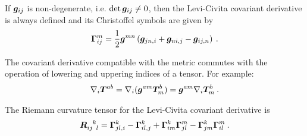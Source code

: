 If $\boldsymbol{g}_{ij}$ is non-degenerate, i.e. $\det \boldsymbol{g}_{ij} \neq 0$, then the Levi-Civita covariant derivative is always defined and its Christoffel symbols are given by
\begin{align}
    \boldsymbol{\Gamma}^m_{ij} =\frac{1}{2} \boldsymbol{g}^{mn} \left( \boldsymbol{g}_{jn,i} + \boldsymbol{g}_{ni,j} - \boldsymbol{g}_{ij,n} \right) \:.
\end{align}

The covariant derivative compatible with the metric commutes with the operation of lowering and uppering indices of a tensor. For example:
\begin{align}
    \nabla_i \boldsymbol{T}^{ab} = \nabla_i (\boldsymbol{g}^{am} \boldsymbol{T}^b_m) = \boldsymbol{g}^{am} \nabla_i \boldsymbol{T}^b_m \:.
\end{align}

The Riemann curvature tensor for the Levi-Civita covariant derivative is
\begin{align}
    \vc R\indices{_i_j^k_l} = \vc \Gamma^k_{jl,i} - \vc \Gamma^k_{il,j} + \vc \Gamma^k_{im} \vc \Gamma^m_{jl} - \vc \Gamma^k_{jm} \vc \Gamma^m_{il} \:.
\end{align}
